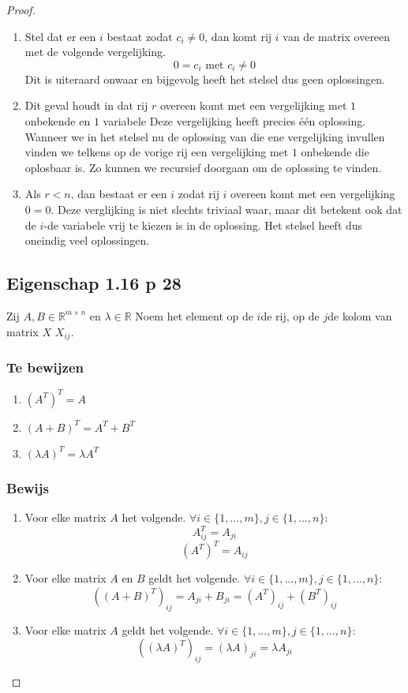 \documentclass[lineaire_algebra_oplossingen.tex]{subfiles}
\begin{document}
\begin{proof}
\begin{enumerate}
\item Stel dat er een $i$ bestaat zodat $c_i \neq 0$, dan komt rij $i$ van de matrix overeen met de volgende vergelijking.
\[
0 = c_i \text{ met } c_i \neq 0
\]
Dit is uiteraard onwaar en bijgevolg heeft het stelsel dus geen oplossingen.
\item
Dit geval houdt in dat rij $r$ overeen komt met een vergelijking met $1$ onbekende en $1$ variabele
Deze vergelijking heeft precies \'e\'en oplossing.
Wanneer we in het stelsel nu de oplossing van die ene vergelijking invullen vinden we telkens op de vorige rij een vergelijking met $1$ onbekende die oplosbaar is.
Zo kunnen we recursief doorgaan om de oplossing te vinden.
\item
Als $r < n$, dan bestaat er een $i$ zodat rij $i$ overeen komt met een vergelijking $0=0$.
Deze verglijking is niet slechts triviaal waar, maar dit betekent ook dat de $i$-de variabele vrij te kiezen is in de oplossing.
Het stelsel heeft dus oneindig veel oplossingen.
\end{enumerate}


\subsection{Eigenschap 1.16 p 28}
\label{1.16}
Zij $A,B \in \mathbb{R}^{m\times n} $ en $\lambda \in \mathbb{R}$
Noem het element op de $i$de rij, op de $j$de kolom van matrix $X$ $X_{ij}$.

\subsubsection*{Te bewijzen}
\begin{enumerate}
\item $(A^T)^T = A$
\item $(A+B)^T = A^T + B^T$
\item $(\lambda A)^T=\lambda A^T$
\end{enumerate}

\subsubsection*{Bewijs}
\begin{enumerate}
\item Voor elke matrix $A$ het volgende. $\forall i\in \{1,...,m\} ,j \in \{1,...,n\}:$
\[
A^T_{ij} = A_{ji}
\]
\[
(A^T)^T = A_{ij}
\]
\item Voor elke matrix $A$ en $B$ geldt het volgende. $\forall i\in \{1,...,m\} ,j \in \{1,...,n\}:$
\[
((A+B)^T)_{ij} = A_{ji}+B_{ji}= (A^T)_{ij} + (B^T)_{ij}
\]
\item Voor elke matrix $A$ geldt het volgende. $\forall i\in \{1,...,m\} ,j \in \{1,...,n\}:$
\[
((\lambda A)^T)_{ij} = (\lambda A)_{ji} = \lambda A_{ji}
\]
\end{enumerate}
\end{proof}
\end{document}

